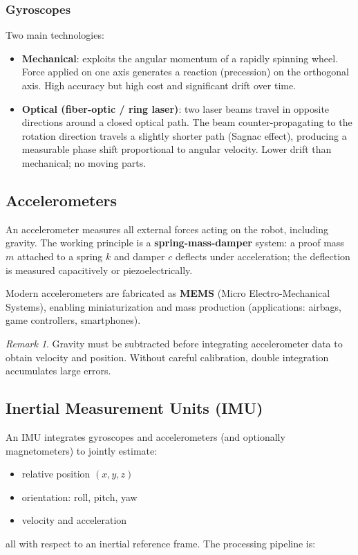 \documentclass[11pt,a4paper]{article}
\theoremstyle{definition}
\theoremstyle{plain}
\theoremstyle{remark}
\newtheorem*{remark}{Remark}
\begin{document}
\subsubsection*{Gyroscopes}

Two main technologies:

\begin{itemize}
    \item \textbf{Mechanical}: exploits the angular momentum of a rapidly spinning wheel. Force applied on one axis generates a reaction (precession) on the orthogonal axis. High accuracy but high cost and significant drift over time.
    \item \textbf{Optical (fiber-optic / ring laser)}: two laser beams travel in opposite directions around a closed optical path. The beam counter-propagating to the rotation direction travels a slightly shorter path (Sagnac effect), producing a measurable phase shift proportional to angular velocity. Lower drift than mechanical; no moving parts.
\end{itemize}

\subsection{Accelerometers}

An accelerometer measures all external forces acting on the robot, including gravity. The working principle is a \textbf{spring-mass-damper} system: a proof mass $m$ attached to a spring $k$ and damper $c$ deflects under acceleration; the deflection is measured capacitively or piezoelectrically.

Modern accelerometers are fabricated as \textbf{MEMS} (Micro Electro-Mechanical Systems), enabling miniaturization and mass production (applications: airbags, game controllers, smartphones).

\begin{remark}
Gravity must be subtracted before integrating accelerometer data to obtain velocity and position. Without careful calibration, double integration accumulates large errors.
\end{remark}

\subsection{Inertial Measurement Units (IMU)}

An IMU integrates gyroscopes and accelerometers (and optionally magnetometers) to jointly estimate:
\begin{itemize}
    \item relative position $(x, y, z)$
    \item orientation: roll, pitch, yaw
    \item velocity and acceleration
\end{itemize}
all with respect to an inertial reference frame. The processing pipeline is:
\end{document}

